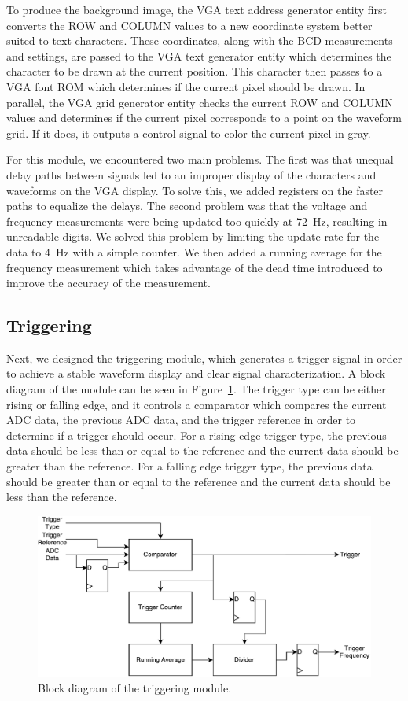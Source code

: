 \documentclass[journal]{IEEEtran}
\begin{document}
To produce the background image, the VGA text address generator entity first converts the ROW and COLUMN values to a new coordinate system better suited to text characters. These coordinates, along with the BCD measurements and settings, are passed to the VGA text generator entity which determines the character to be drawn at the current position. This character then passes to a VGA font ROM which determines if the current pixel should be drawn.
In parallel, the VGA grid generator entity checks the current ROW and COLUMN values and determines if the current pixel corresponds to a point on the waveform grid. If it does, it outputs a control signal to color the current pixel in gray.

For this module, we encountered two main problems. The first was that unequal delay paths between signals led to an improper display of the characters and waveforms on the VGA display. To solve this, we added registers on the faster paths to equalize the delays. The second problem was that the voltage and frequency measurements were being updated too quickly at 72~Hz, resulting in unreadable digits. We solved this problem by limiting the update rate for the data to 4~Hz with a simple counter. We then added a running average for the frequency measurement which takes advantage of the dead time introduced to improve the accuracy of the measurement.

\subsection{Triggering}

Next, we designed the triggering module, which generates a trigger signal in order to achieve a stable waveform display and clear signal characterization. A block diagram of the module can be seen in Figure~\ref{fig:triggering}. The trigger type can be either rising or falling edge, and it controls a comparator which compares the current ADC data, the previous ADC data, and the trigger reference in order to determine if a trigger should occur. For a rising edge trigger type, the previous data should be less than or equal to the reference and the current data should be greater than the reference. For a falling edge trigger type, the previous data should be greater than or equal to the reference and the current data should be less than the reference.

\begin{figure}[!htb]
  \centering
  \includegraphics[width=\columnwidth]{diagrams/triggering.pdf}
  \caption{Block diagram of the triggering module.}
  \label{fig:triggering}
\end{figure}
\end{document}
